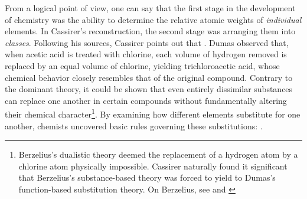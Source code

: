 \documentclass[submitted,12pt]{article}
\begin{document}
From a logical point of view, one can say that the first stage in the development of chemistry was the ability to determine the relative atomic weights of \emph{individual} elements. In Cassirer's reconstruction, the second stage was arranging them into \emph{classes}. Following his sources, Cassirer points out that  . Dumas observed that, when acetic acid is treated with chlorine, each volume of hydrogen removed is replaced by an equal volume of chlorine, yielding trichloroacetic acid, whose chemical behavior closely resembles that of the original compound. Contrary to the dominant theory, it could be shown that even entirely dissimilar substances can replace one another in certain compounds without fundamentally altering their chemical character\footnote{Berzelius's dualistic theory deemed the replacement of a  hydrogen atom by a  chlorine atom physically impossible. Cassirer naturally found it significant that Berzelius's substance-based theory was forced to yield to Dumas's function-based substitution theory. On Berzelius, see \citet[lect.~VI]{Ladenburg1902} and \citet[lect.~V]{Ostwald1906Leitlinien}}. By examining how different elements substitute for one another, chemists uncovered basic rules governing these substitutions:  . 

\end{document}
